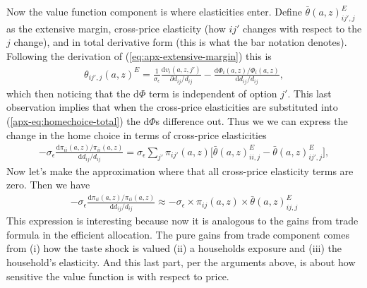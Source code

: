 \documentclass[12pt,pdftex]{article}
\begin{document}
\begin{onehalfspacing}
Now the value function component is where elasticities enter. Define $\bar{\theta}(a,z) ^E_{ij',j}$ as the extensive margin, cross-price elasticity (how $ij'$ changes with respect to the $j$ change), and in total derivative form (this is what the bar notation denotes). Following the derivation of (\ref{eq:apx-extensive-margin}) this is
\begin{align}
\theta_{ij',j}(a,z)^{E} = \frac{1}{\sigma_{\epsilon}}\frac{\mathrm{d} v_{i}(a, z, j')}{\partial d_{ij}/d_{ij}} -  \frac{\mathrm{d} \Phi_{i}(a,z) / \Phi_{i}(a,z)}{\mathrm{d} d_{ij}/d_{ij}},
\end{align}
which then noticing that the $\mathrm{d} \Phi$ term is independent of option $j'$. This last observation implies that when the cross-price elasticities are substituted into (\ref{apx-eq:homechoice-total}) the $\mathrm{d} \Phi$s difference out. Thus we we can express the change in the home choice in terms of cross-price elasticities
\begin{align}
-\sigma_{\epsilon} \frac{\mathrm{d} \pi_{ii}(a,z) / \pi_{ii}(a,z) }{\mathrm{d} d_{ij} / d_{ij}} = \sigma_{\epsilon} \sum_{j'} \pi_{ij'}(a,z) \bigg[ \bar{\theta}(a,z) ^E_{ii,j} - \bar{\theta}(a,z) ^E_{ij',j}\bigg],
\end{align}
Now let's make the approximation where that all cross-price elasticity terms are zero. Then we have
\begin{align}
-\sigma_{\epsilon} \frac{\mathrm{d} \pi_{ii}(a,z) / \pi_{ii}(a,z) }{\mathrm{d} d_{ij} / d_{ij}} \approx
- \sigma_{\epsilon} \times \pi_{ij}(a,z) \times \bar{\theta}(a,z) ^E_{ij,j}
\end{align}
This expression is interesting because now it is analogous to the gains from trade formula in the efficient allocation. The pure gains from trade component comes from (i) how the taste shock is valued (ii) a households exposure and (iii) the household's elasticity. And this last part, per the arguments above, is about how sensitive the value function is with respect to price.



\end{onehalfspacing}
\end{document}
